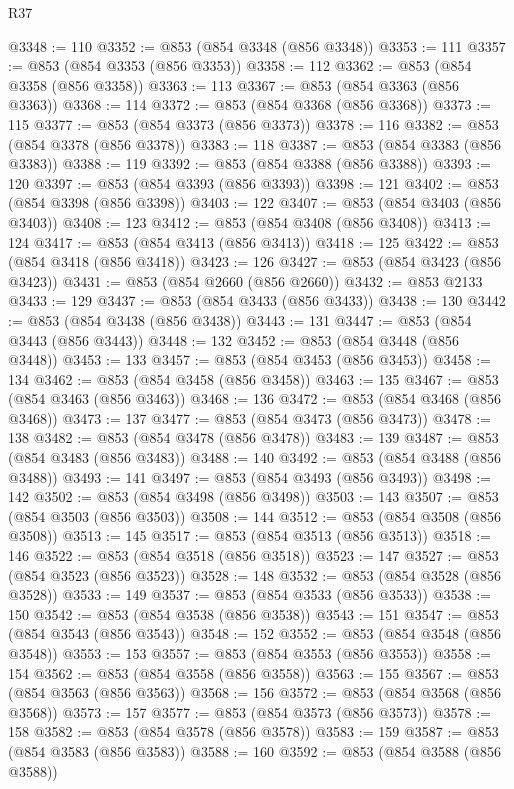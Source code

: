 \begin{lexlean}{R37}
\begin{coremodule}
@3348 := 110
@3352 := @853 (@854 @3348 (@856 @3348))
@3353 := 111
@3357 := @853 (@854 @3353 (@856 @3353))
@3358 := 112
@3362 := @853 (@854 @3358 (@856 @3358))
@3363 := 113
@3367 := @853 (@854 @3363 (@856 @3363))
@3368 := 114
@3372 := @853 (@854 @3368 (@856 @3368))
@3373 := 115
@3377 := @853 (@854 @3373 (@856 @3373))
@3378 := 116
@3382 := @853 (@854 @3378 (@856 @3378))
@3383 := 118
@3387 := @853 (@854 @3383 (@856 @3383))
@3388 := 119
@3392 := @853 (@854 @3388 (@856 @3388))
@3393 := 120
@3397 := @853 (@854 @3393 (@856 @3393))
@3398 := 121
@3402 := @853 (@854 @3398 (@856 @3398))
@3403 := 122
@3407 := @853 (@854 @3403 (@856 @3403))
@3408 := 123
@3412 := @853 (@854 @3408 (@856 @3408))
@3413 := 124
@3417 := @853 (@854 @3413 (@856 @3413))
@3418 := 125
@3422 := @853 (@854 @3418 (@856 @3418))
@3423 := 126
@3427 := @853 (@854 @3423 (@856 @3423))
@3431 := @853 (@854 @2660 (@856 @2660))
@3432 := @853 @2133
@3433 := 129
@3437 := @853 (@854 @3433 (@856 @3433))
@3438 := 130
@3442 := @853 (@854 @3438 (@856 @3438))
@3443 := 131
@3447 := @853 (@854 @3443 (@856 @3443))
@3448 := 132
@3452 := @853 (@854 @3448 (@856 @3448))
@3453 := 133
@3457 := @853 (@854 @3453 (@856 @3453))
@3458 := 134
@3462 := @853 (@854 @3458 (@856 @3458))
@3463 := 135
@3467 := @853 (@854 @3463 (@856 @3463))
@3468 := 136
@3472 := @853 (@854 @3468 (@856 @3468))
@3473 := 137
@3477 := @853 (@854 @3473 (@856 @3473))
@3478 := 138
@3482 := @853 (@854 @3478 (@856 @3478))
@3483 := 139
@3487 := @853 (@854 @3483 (@856 @3483))
@3488 := 140
@3492 := @853 (@854 @3488 (@856 @3488))
@3493 := 141
@3497 := @853 (@854 @3493 (@856 @3493))
@3498 := 142
@3502 := @853 (@854 @3498 (@856 @3498))
@3503 := 143
@3507 := @853 (@854 @3503 (@856 @3503))
@3508 := 144
@3512 := @853 (@854 @3508 (@856 @3508))
@3513 := 145
@3517 := @853 (@854 @3513 (@856 @3513))
@3518 := 146
@3522 := @853 (@854 @3518 (@856 @3518))
@3523 := 147
@3527 := @853 (@854 @3523 (@856 @3523))
@3528 := 148
@3532 := @853 (@854 @3528 (@856 @3528))
@3533 := 149
@3537 := @853 (@854 @3533 (@856 @3533))
@3538 := 150
@3542 := @853 (@854 @3538 (@856 @3538))
@3543 := 151
@3547 := @853 (@854 @3543 (@856 @3543))
@3548 := 152
@3552 := @853 (@854 @3548 (@856 @3548))
@3553 := 153
@3557 := @853 (@854 @3553 (@856 @3553))
@3558 := 154
@3562 := @853 (@854 @3558 (@856 @3558))
@3563 := 155
@3567 := @853 (@854 @3563 (@856 @3563))
@3568 := 156
@3572 := @853 (@854 @3568 (@856 @3568))
@3573 := 157
@3577 := @853 (@854 @3573 (@856 @3573))
@3578 := 158
@3582 := @853 (@854 @3578 (@856 @3578))
@3583 := 159
@3587 := @853 (@854 @3583 (@856 @3583))
@3588 := 160
@3592 := @853 (@854 @3588 (@856 @3588))

\end{coremodule}
\end{lexlean}
